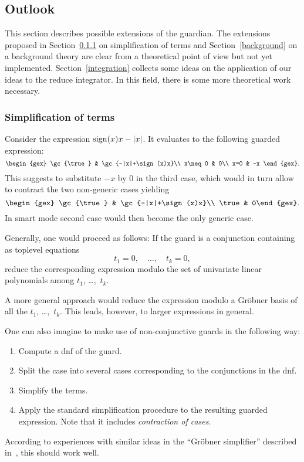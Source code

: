 \subsection{Outlook}
This section describes possible extensions of the {\sc guardian}. The
extensions proposed in Section~\ref{simplification} on simplification
of terms and Section~\ref{background} on a background theory are clear
from a theoretical point of view but not yet implemented.
Section~\ref{integration} collects some ideas on the application of
our ideas to the {\sc reduce} integrator. In this field, there is some
more theoretical work necessary.
%
\subsubsection{Simplification of terms}\label{simplification}
Consider the expression $\sign(x)x-|x|$. It evaluates to the following
guarded expression:
$$
\begin{gex}
\gc{\true} & \gc{-|x|+\sign(x)x}\\
x\neq 0 & 0\\
x=0 & -x
\end{gex}.
$$
This suggests to substitute $-x$ by $0$ in the third case, which would
in turn allow to contract the two non-generic cases yielding
$$
\begin{gex}
\gc{\true} & \gc{-|x|+\sign(x)x}\\
\true & 0\end{gex}.
$$
In smart mode second case would then become the only generic case.

Generally, one would proceed as follows: If the guard is a conjunction
containing as toplevel equations
$$
t_1=0,\quad \dots,\quad t_k=0,
$$
reduce the corresponding expression modulo the set of univariate
linear polynomials among $t_1$, \dots,~$t_k$.

A more general approach would reduce the expression modulo a Gr\"obner
basis of all the $t_1$, \dots,~$t_k$. This leads, however, to larger
expressions in general.

One can also imagine to make use of non-conjunctive guards in the
following way:
\begin{enumerate}
\item Compute a {\sc dnf} of the guard.
\item Split the case into several cases corresponding to the
conjunctions in the {\sc dnf}.
\item Simplify the terms.
\item Apply the standard simplification procedure to the resulting
guarded expression. Note that it includes {\em contraction of cases}.
\end{enumerate}
According to experiences with similar ideas in the ``Gr\"obner
simplifier'' described in~\cite{DolzmannSturm:95}, this should work
well.
%
